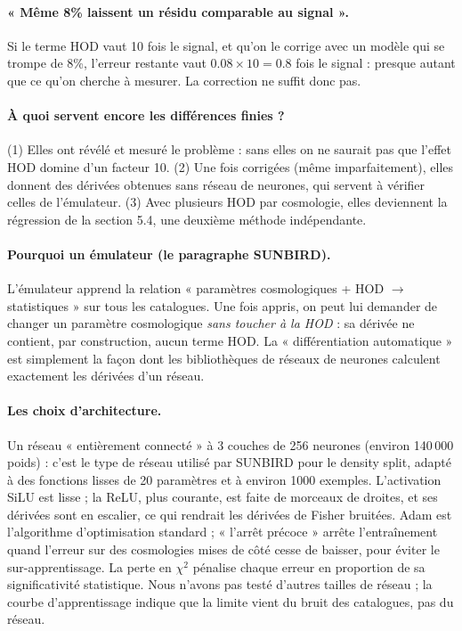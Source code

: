 \paragraph{« Même 8\% laissent un résidu comparable au signal ».} Si le terme HOD vaut 10 fois le signal, et qu'on le corrige avec un modèle qui se trompe de 8\%, l'erreur restante vaut $0.08\times10 = 0.8$ fois le signal : presque autant que ce qu'on cherche à mesurer. La correction ne suffit donc pas.

\paragraph{À quoi servent encore les différences finies ?} (1) Elles ont révélé et mesuré le problème : sans elles on ne saurait pas que l'effet HOD domine d'un facteur 10. (2) Une fois corrigées (même imparfaitement), elles donnent des dérivées obtenues sans réseau de neurones, qui servent à vérifier celles de l'émulateur. (3) Avec plusieurs HOD par cosmologie, elles deviennent la régression de la section 5.4, une deuxième méthode indépendante.

\paragraph{Pourquoi un émulateur (le paragraphe SUNBIRD).} L'émulateur apprend la relation « paramètres cosmologiques + HOD $\to$ statistiques » sur tous les catalogues. Une fois appris, on peut lui demander de changer un paramètre cosmologique \emph{sans toucher à la HOD} : sa dérivée ne contient, par construction, aucun terme HOD. La « différentiation automatique » est simplement la façon dont les bibliothèques de réseaux de neurones calculent exactement les dérivées d'un réseau.

\paragraph{Les choix d'architecture.} Un réseau « entièrement connecté » à 3 couches de 256 neurones (environ 140\,000 poids) : c'est le type de réseau utilisé par SUNBIRD pour le density split, adapté à des fonctions lisses de 20 paramètres et à environ 1000 exemples. L'activation SiLU est lisse ; la ReLU, plus courante, est faite de morceaux de droites, et ses dérivées sont en escalier, ce qui rendrait les dérivées de Fisher bruitées. Adam est l'algorithme d'optimisation standard ; « l'arrêt précoce » arrête l'entraînement quand l'erreur sur des cosmologies mises de côté cesse de baisser, pour éviter le sur-apprentissage. La perte en $\chi^2$ pénalise chaque erreur en proportion de sa significativité statistique. Nous n'avons pas testé d'autres tailles de réseau ; la courbe d'apprentissage indique que la limite vient du bruit des catalogues, pas du réseau.

